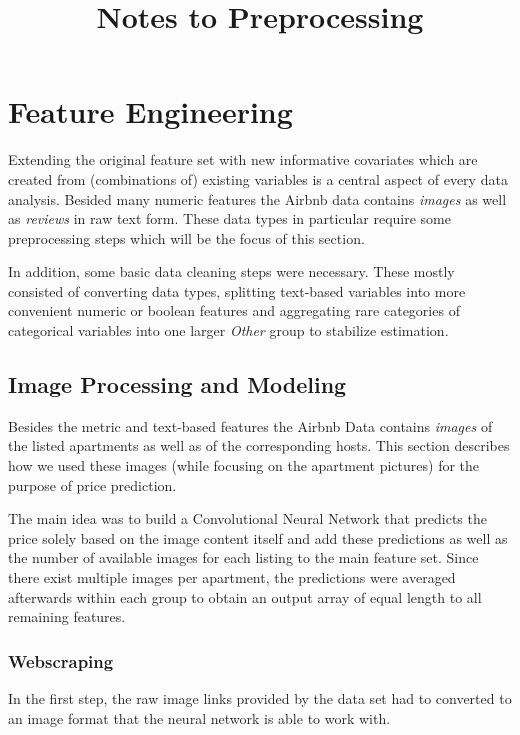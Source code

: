 \documentclass[12pt, letterpaper]{article}
\title{Notes to Preprocessing}
\author{}
\date{}
\begin{document}
\maketitle

\section{Feature Engineering}

Extending the original feature set with new informative covariates which are created from (combinations of) existing variables is a central aspect of every data analysis.
Besided many numeric features the Airbnb data contains \emph{images} as well as \emph{reviews} in raw text form.
These data types in particular require some preprocessing steps which will be the focus of this section.

In addition, some basic data cleaning steps were necessary.
These mostly consisted of converting data types, splitting text-based variables into more convenient numeric or boolean features and aggregating rare categories of categorical variables into one larger \emph{Other} group to stabilize estimation.


\subsection{Image Processing and Modeling}

Besides the metric and text-based features the Airbnb Data contains \emph{images} of the listed apartments as well as of the corresponding hosts.
This section describes how we used these images (while focusing on the apartment pictures) for the purpose of price prediction.

The main idea was to build a Convolutional Neural Network that predicts the price solely based on the image content itself and add these predictions as well as the number of available images for each listing to the main feature set.
Since there exist multiple images per apartment, the predictions were averaged afterwards within each group to obtain an output array of equal length to all remaining features.

\subsubsection{Webscraping}

In the first step, the raw image links provided by the data set had to converted to an image format that the neural network is able to work with.
\end{document}
